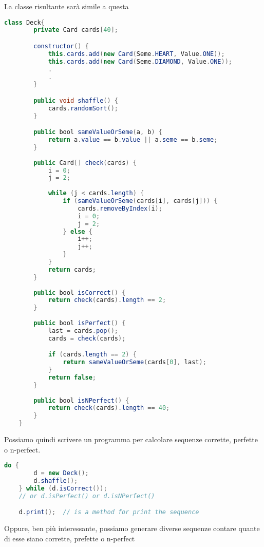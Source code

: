 \documentclass[a4paper]{article}
\begin{document}
La classe risultante sarà simile a questa
\begin{lstlisting}[language=Java]
    class Deck{
        private Card cards[40];

        constructor() {
            this.cards.add(new Card(Seme.HEART, Value.ONE));
            this.cards.add(new Card(Seme.DIAMOND, Value.ONE));
            .
            .
        }

        public void shaffle() { 
            cards.randomSort(); 
        }

        public bool sameValueOrSeme(a, b) {
            return a.value == b.value || a.seme == b.seme;
        }
    
        public Card[] check(cards) {
            i = 0;
            j = 2;
    
            while (j < cards.length) {
                if (sameValueOrSeme(cards[i], cards[j])) {
                    cards.removeByIndex(i);
                    i = 0;
                    j = 2;
                } else {
                    i++;
                    j++;
                }
            }
            return cards;
        }
    
        public bool isCorrect() {
            return check(cards).length == 2;
        }
    
        public bool isPerfect() {
            last = cards.pop();
            cards = check(cards);

            if (cards.length == 2) {
                return sameValueOrSeme(cards[0], last);
            }
            return false;
        }
    
        public bool isNPerfect() {
            return check(cards).length == 40;
        }
    }
\end{lstlisting}

\newpage

\noindent
Possiamo quindi scrivere un programma per calcolare sequenze corrette, perfette o n-perfect.

\begin{lstlisting}[language=Java]
    do {
        d = new Deck();
        d.shaffle();
    } while (d.isCorrect());
    // or d.isPerfect() or d.isNPerfect()

    d.print();  // is a method for print the sequence
\end{lstlisting}

\vspace{0.5cm}
\noindent
Oppure, ben più interessante, possiamo generare diverse sequenze contare quante di esse siano corrette, prefette o n-perfect
\end{document}
